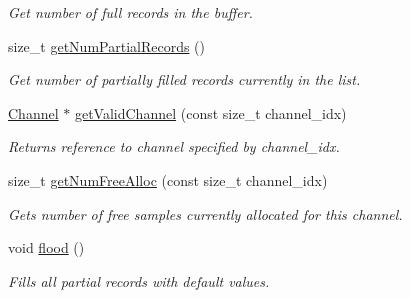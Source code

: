 \begin{DoxyCompactItemize}
\begin{DoxyCompactList}\small\item\em Get number of full records in the buffer. \item\end{DoxyCompactList}\item 
\hypertarget{classgdf_1_1_record_buffer_a26a79cdf41e61e9bf900b5c044e41777}{
size\_\-t \hyperlink{classgdf_1_1_record_buffer_a26a79cdf41e61e9bf900b5c044e41777}{getNumPartialRecords} ()}
\label{classgdf_1_1_record_buffer_a26a79cdf41e61e9bf900b5c044e41777}

\begin{DoxyCompactList}\small\item\em Get number of partially filled records currently in the list. \item\end{DoxyCompactList}\item 
\hyperlink{classgdf_1_1_channel}{Channel} $\ast$ \hyperlink{classgdf_1_1_record_buffer_a780d3156d97dd0e2f7121e813419035a}{getValidChannel} (const size\_\-t channel\_\-idx)
\begin{DoxyCompactList}\small\item\em Returns reference to channel specified by channel\_\-idx. \item\end{DoxyCompactList}\item 
\hypertarget{classgdf_1_1_record_buffer_a924508d9e9988f4a97545b3070a2d156}{
size\_\-t \hyperlink{classgdf_1_1_record_buffer_a924508d9e9988f4a97545b3070a2d156}{getNumFreeAlloc} (const size\_\-t channel\_\-idx)}
\label{classgdf_1_1_record_buffer_a924508d9e9988f4a97545b3070a2d156}

\begin{DoxyCompactList}\small\item\em Gets number of free samples currently allocated for this channel. \item\end{DoxyCompactList}\item 
\hypertarget{classgdf_1_1_record_buffer_ad58cb7b3c52b576d35abab83db4b5cad}{
void \hyperlink{classgdf_1_1_record_buffer_ad58cb7b3c52b576d35abab83db4b5cad}{flood} ()}
\label{classgdf_1_1_record_buffer_ad58cb7b3c52b576d35abab83db4b5cad}

\begin{DoxyCompactList}\small\item\em Fills all partial records with default values. \item\end{DoxyCompactList}\end{DoxyCompactItemize}



